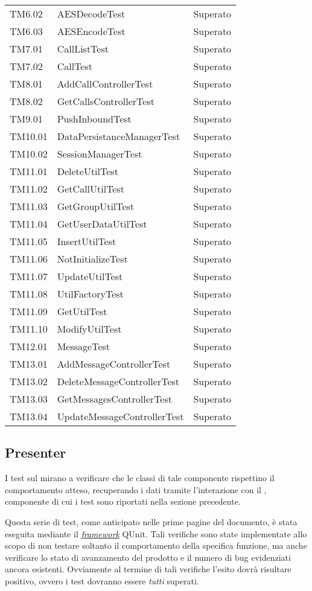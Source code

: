 \begin{center}
\begin{longtable}{p{}ll}
TM6.02 & AESDecodeTest &Superato\\
TM6.03 & AESEncodeTest &Superato\\
TM7.01 & CallListTest &Superato\\
TM7.02 & CallTest &Superato\\
TM8.01 & AddCallControllerTest &Superato\\
TM8.02 & GetCallsControllerTest &Superato\\
TM9.01 & PushInboundTest &Superato\\
TM10.01 & DataPersistanceManagerTest &Superato\\
TM10.02 & SessionManagerTest &Superato\\
TM11.01 & DeleteUtilTest &Superato\\
TM11.02 & GetCallUtilTest &Superato\\
TM11.03 & GetGroupUtilTest &Superato\\
TM11.04 & GetUserDataUtilTest &Superato\\
TM11.05 & InsertUtilTest &Superato\\
TM11.06 & NotInitializeTest &Superato\\
TM11.07 & UpdateUtilTest &Superato\\
TM11.08 & UtilFactoryTest &Superato\\
TM11.09 & GetUtilTest &Superato\\
TM11.10 & ModifyUtilTest & Superato\\
TM12.01 & MessageTest &Superato\\
TM13.01 & AddMessageControllerTest &Superato\\
TM13.02 & DeleteMessageControllerTest &Superato\\
TM13.03 & GetMessagesControllerTest &Superato\\
TM13.04 & UpdateMessageControllerTest &Superato\\
\bottomrule
\end{longtable}
\end{center}

\subsection{Presenter}
I test sul  mirano a verificare che le classi di tale componente rispettino il comportamento atteso, recuperando i dati tramite l'interazione con il , componente di cui i test sono riportati nella sezione precedente.

Questa serie di test, come anticipato nelle prime pagine del documento, è stata eseguita mediante il \underline{\textit{framework}} QUnit. Tali verifiche sono state implementate allo scopo di non testare soltanto il comportamento della specifica funzione, ma anche verificare lo stato di avanzamento del prodotto e il numero di bug evidenziati ancora esistenti.
Ovviamente al termine di tali verifiche l'esito dovrà risultare positivo, ovvero i test dovranno essere \textit{tutti} superati.

